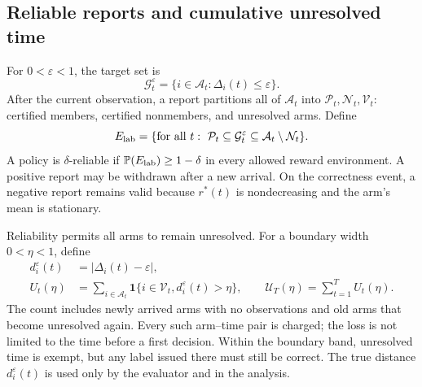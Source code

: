 \documentclass[11pt]{article}
\theoremstyle{remark}
\newcommand{\Prob}{\mathbb P}
\newcommand{\ind}{\mathbf 1}
\begin{document}
\subsection{Reliable reports and cumulative unresolved time}
\label{sec:reporting_task}

For $0<\varepsilon<1$, the target set is
\[
 \mathcal G_t^\varepsilon=\{i\in\mathcal A_t:\Delta_i(t)\le\varepsilon\}.
\]
After the current observation, a report partitions all of $\mathcal A_t$
into $\mathcal P_t,\mathcal N_t,\mathcal V_t$: certified members, certified
nonmembers, and unresolved arms. Define
\[
 E_{\rm lab}=\{\text{for all }t:\ \mathcal P_t\subseteq\mathcal G_t^\varepsilon
                  \subseteq\mathcal A_t\setminus\mathcal N_t\}.
\]
A policy is $\delta$-reliable if $\Prob(E_{\rm lab})\ge1-\delta$ in every
allowed reward environment. A positive report may be withdrawn after a new
arrival. On the correctness event, a negative report remains valid because
$r^*(t)$ is nondecreasing and the arm's mean is stationary.

Reliability permits all arms to remain unresolved. For a boundary width
$0<\eta<1$, define
\begin{equation}
 \begin{split}
 d_i^\varepsilon(t)&=|\Delta_i(t)-\varepsilon|,\\
 U_t(\eta)&=\sum_{i\in\mathcal A_t}
   \ind\{i\in\mathcal V_t,d_i^\varepsilon(t)>\eta\},\qquad
 \mathcal U_T(\eta)=\sum_{t=1}^{T}U_t(\eta).
 \end{split}
 \label{eq:area}
\end{equation}
The count includes newly arrived arms with no observations and old arms
that become unresolved again. Every such arm--time pair is charged; the
loss is not limited to the time before a first decision. Within the
boundary band, unresolved time is exempt, but any label issued there must
still be correct. The true distance $d_i^\varepsilon(t)$ is used only by
the evaluator and in the analysis.
\end{document}
